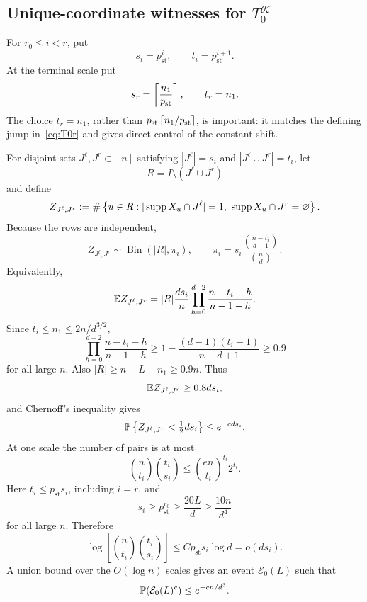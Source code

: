 \subsection{\texorpdfstring{Unique-coordinate witnesses for $T_0^{\mathcal K}$}{Unique-coordinate witnesses for T0K}}

For $r_0\le i<r$, put
\begin{equation}\label{eq:si-ti}
  s_i=p_{\mathrm{st}}^i,
  \qquad
  t_i=p_{\mathrm{st}}^{i+1}.
\end{equation}
At the terminal scale put
\begin{equation}\label{eq:sr-tr}
  s_r=\left\lceil \frac{n_1}{p_{\mathrm{st}}}\right\rceil,
  \qquad
  t_r=n_1.
\end{equation}
The choice $t_r=n_1$, rather than $p_{\mathrm{st}}\left\lceil n_1/p_{\mathrm{st}}\right\rceil$, is important: it matches the defining jump in~\eqref{eq:T0r} and gives direct control of the constant shift.

For disjoint sets $J^\ell,J^r\subset[n]$ satisfying $|J^\ell|=s_i$ and $|J^\ell\cup J^r|=t_i$, let
\[
  R=I\setminus(J^\ell\cup J^r)
\]
and define
\begin{equation}\label{eq:unique-witness-count}
  Z_{J^\ell,J^r}:=
  \#\left\{u\in R:|\operatorname{supp} X_u\cap J^\ell|=1,\ \operatorname{supp} X_u\cap J^r=\varnothing\right\}.
\end{equation}
Because the rows are independent,
\[
  Z_{J^\ell,J^r}\sim\operatorname{Bin}(|R|,\pi_i),
  \qquad
  \pi_i=s_i\frac{\binom{n-t_i}{d-1}}{\binom nd}.
\]
Equivalently,
\begin{equation}\label{eq:unique-witness-mean}
  \mathbb E Z_{J^\ell,J^r}
  =|R|\frac{ds_i}{n}\prod_{h=0}^{d-2}\frac{n-t_i-h}{n-1-h}.
\end{equation}
Since $t_i\le n_1\le2n/d^{3/2}$,
\[
  \prod_{h=0}^{d-2}\frac{n-t_i-h}{n-1-h}
  \ge1-\frac{(d-1)(t_i-1)}{n-d+1}
  \ge0.9
\]
for all large $n$. Also $|R|\ge n-L-n_1\ge0.9n$. Thus
\begin{equation}\label{eq:unique-witness-mean-lower}
  \mathbb E Z_{J^\ell,J^r}\ge0.8ds_i,
\end{equation}
and Chernoff's inequality gives
\begin{equation}\label{eq:unique-witness-chernoff}
  \mathbb P\left\{Z_{J^\ell,J^r}<\tfrac12ds_i\right\}\le e^{-cds_i}.
\end{equation}
At one scale the number of pairs is at most
\[
  \binom n{t_i}\binom{t_i}{s_i}
  \le\left(\frac{en}{t_i}\right)^{t_i}2^{t_i}.
\]
Here $t_i\le p_{\mathrm{st}}s_i$, including $i=r$, and
\[
  s_i\ge p_{\mathrm{st}}^{r_0}\ge\frac{20L}{d}\ge\frac{10n}{d^4}
\]
for all large $n$. Therefore
\[
  \log\left[\binom n{t_i}\binom{t_i}{s_i}\right]
  \le Cp_{\mathrm{st}}s_i\log d=o(ds_i).
\]
A union bound over the $O(\log n)$ scales gives an event $\mathcal E_0(L)$ such that
\begin{equation}\label{eq:E0-failure}
  \mathbb P(\mathcal E_0(L)^c)\le e^{-cn/d^3}.
\end{equation}

